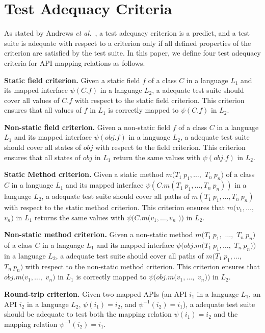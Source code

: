 \section{Test Adequacy Criteria}
\label{sec:mapping}
As stated by Andrews \emph{et al.}~\cite{andrews2003test}, a test adequacy criterion is a predict, and a test suite is adequate with respect to a criterion only if all defined properties of the criterion are satisfied by the test suite. In this paper, we define four test adequacy criteria for API mapping relations as follows.

\textbf{Static field criterion.} Given a static field $f$ of a class $C$ in a language $L_1$ and its mapped interface $\psi(C.f)$ in a language $L_2$, a adequate test suite should cover all values of $C.f$ with respect to the static field criterion. This criterion ensures that all values of $f$ in $L_1$ is correctly mapped to $\psi(C.f)$ in $L_2$.

\textbf{Non-static field criterion.} Given a non-static field $f$ of a class $C$ in a language $L_1$ and its mapped interface $\psi(obj.f)$ in a language $L_2$, a adequate test suite should cover all states of $obj$ with respect to the field criterion. This criterion ensures that all states of $obj$ in $L_1$ return the same values with $\psi(obj.f)$ in $L_2$.

\textbf{Static Method criterion.} Given a static method $m(T_1\ p_1,\ldots,$ $T_n\ p_n)$ of a class $C$ in a language $L_1$ and its mapped interface $\psi(C.m(T_1\ p_1,\ldots,T_n\ p_n))$ in a language $L_2$, a adequate test suite should cover all paths of $m(T_1\ p_1,\ldots,T_n\ p_n)$ with respect to the static method criterion. This criterion ensures that $m(v_1,\ldots,$ $v_n)$ in $L_1$ returns the same values with $\psi(C.m(v_1,\ldots,v_n$ $))$ in $L_2$.

\textbf{Non-static method criterion.} Given a non-static method $m(T_1\ p_1,$ $\ldots,$ $T_n\ p_n)$ of a class $C$ in a language $L_1$ and its mapped interface $\psi(obj.m(T_1\ p_1,\ldots,$ $T_n\ p_n))$ in a language $L_2$, a adequate test suite should cover all paths of $m(T_1\ p_1,\ldots,$ $T_n\ p_n)$ with respect to the non-static method criterion. This criterion ensures that $obj.m(v_1,\ldots,$ $ v_n)$ in $L_1$ is correctly mapped to $\psi(obj.m(v_1,\ldots,$ $ v_n))$ in $L_2$.

\textbf{Round-trip criterion.} Given two mapped APIs (an API $i_1$ in a language $L_1$, an API $i_2$ in a language $L_2$, $\psi(i_1)=i_2$, and $\psi^{-1}(i_2)=i_1$), a adequate test suite should be adequate to test both the mapping relation $\psi(i_1)=i_2$ and the mapping relation $\psi^{-1}(i_2)=i_1$.
